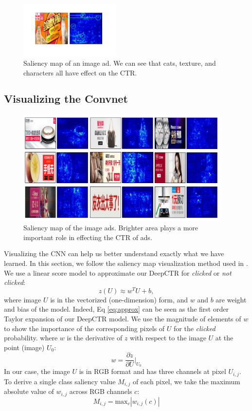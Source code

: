 \documentclass{sig-alternate}
\begin{document}
\begin{figure}
	\centering
	\includegraphics[width=0.45\textwidth]{vis_compare}
	\caption{Saliency map of an image ad. We can see that cats, texture, and characters all have effect on the CTR. }
	\label{fig:vis_compare}
\end{figure}
\subsection{Visualizing the Convnet}
\begin{figure}
	\centering
	\includegraphics[width=0.95\textwidth]{vis}
	\caption{Saliency map of the image ads. Brighter area plays a more important role in effecting the CTR of ads.}
	\label{fig:vis}
\end{figure}
Visualizing the CNN can help us better understand exactly what we have learned. In this section, we follow the saliency map visualization method used in \cite{simonyan2013deep}. We use a linear score model to approximate our DeepCTR for \emph{clicked} or \emph{not clicked}:
\begin{equation}\label{eq:approx}
z(U) \approx w^{T}U + b, 
\end{equation}
where image $U$ is in the vectorized (one-dimension) form, and $w$ and $b$ are weight and bias of the model. Indeed, Eq \ref{eq:approx} can be seen as the first order Taylor expansion of our DeepCTR model. We use the magnitude
of elements of $w$ to show the importance of the corresponding pixels of $U$ for the \emph{clicked} probability. where $w$ is the derivative of $z$ with respect to the image $U$ at the point (image) $U_{0}$:
\begin{equation}
w  = \frac{\partial z}{\partial U} \Big|_{U_{0}}
\end{equation}
In our case, the image $U$ is in RGB format and has three channels at pixel $U_{i,j}$. To derive a single class saliency value $M_{i,j}$ of each pixel, we take the maximum  absolute value of $w_{i,j}$ across RGB channels $c$: 
\begin{equation}
M_{i,j} = \text{max}_{c} |w_{i,j}(c)|
\end{equation}
\end{document}
